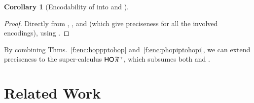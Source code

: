 \documentclass[preprint,11pt]{elsarticle}
\newtheorem{corollary}{Corollary}[section]
\begin{document}
{\begin{corollary}[Encodability of \PHOp into \HOp and \sessp]
\end{corollary}

\begin{proof}
Directly from 
, 
, 
and 
 (which give preciseness for all the involved encodings), using
.
\end{proof}




By combining Thms.~\ref{f:enc:hoppptohop} and~\ref{f:enc:phopiptohopi},
we can extend preciseness to the super-calculus
$\mathsf{HO}\,{\widetilde{\pi}}^{\,+}$, which subsumes both \HOpp and \PHOp.







\section{Related Work}
\label{sec:relwork}
%

}
\end{document}
